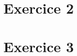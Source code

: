 \documentclass{article}
\begin{document}
	\maketitle
	\section{Exercice 2}
	
	\section{Exercice 3}
	
\end{document}
